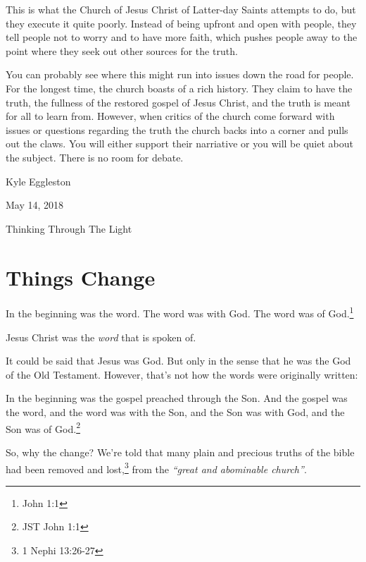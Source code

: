 \documentclass{article}
\begin{document}
This is what the Church of Jesus Christ of Latter-day Saints attempts to do, but
they execute it quite poorly. Instead of being upfront and open with people,
they tell people not to worry and to have more faith, which pushes people away
to the point where they seek out other sources for the truth.

You can probably see where this might run into issues down the road for people.
For the longest time, the church boasts of a rich history. They claim to
have the truth, the fullness of the restored gospel of Jesus Christ, 
and the truth is meant for all to learn from. However, when critics of the 
church come forward with issues or questions regarding the truth the church 
backs into a corner and pulls out the claws. You will either support their 
narriative or you will be quiet about the subject. There is no room for debate.

\begin{flushright}
Kyle Eggleston

May 14, 2018

Thinking Through The Light
\end{flushright}

\newpage


\section{Things Change}

\begin{displayquote}
In the beginning was the word. The word was with God. The word was of 
God.\footnote{John 1:1} 
\end{displayquote}

Jesus Christ was the \textit{word} that is spoken of.

It could be said that Jesus was God. But only in the sense that he was the 
God of the Old Testament.\cite{otStudentManual} However, that's not how the
words were originally written:

\begin{displayquote}
In the beginning was the gospel preached through the Son. And the gospel was 
the word, and the word was with the Son, and the Son was with God, and the Son 
was of God.\footnote{JST John 1:1}
\end{displayquote}

So, why the change? We're told that many plain and precious truths of the bible 
had been removed and lost,\footnote{1 Nephi 13:26-27} from the \textit{``great 
and abominable church''}.
\end{document}
